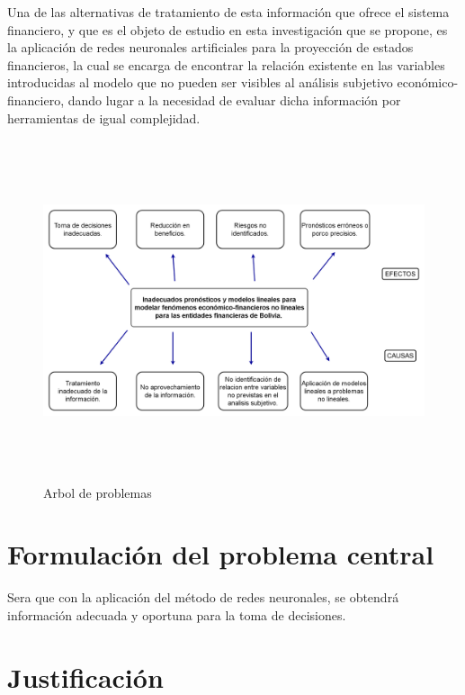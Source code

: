 \documentclass[
  12pt,
]{article}
\begin{document}
Una de las alternativas de tratamiento de esta información que ofrece el
sistema financiero, y que es el objeto de estudio en esta investigación
que se propone, es la aplicación de redes neuronales artificiales para
la proyección de estados financieros, la cual se encarga de encontrar la
relación existente en las variables introducidas al modelo que no pueden
ser visibles al análisis subjetivo económico-financiero, dando lugar a
la necesidad de evaluar dicha información por herramientas de igual
complejidad.

\begin{figure}[h!]
\centering
\includegraphics[width=15cm, height=10cm]{RECURSOS-PLAN-DE-INVESTIGACION/003-PLANTEAMIENTO-DEL-PROBLEMA/arbol-de-problemas.png}
\caption{Arbol de problemas}
\end{figure}

\hypertarget{formulaciuxf3n-del-problema-central}{%
\section{Formulación del problema
central}\label{formulaciuxf3n-del-problema-central}}

Sera que con la aplicación del método de redes neuronales, se obtendrá
información adecuada y oportuna para la toma de decisiones.

\hypertarget{justificaciuxf3n}{%
\section{Justificación}\label{justificaciuxf3n}}
\end{document}
